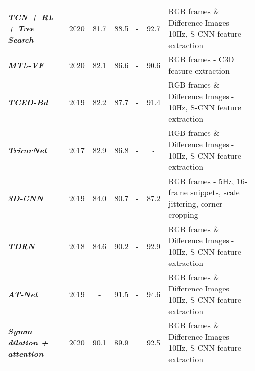 \documentclass[journal]{IEEEtran}
\begin{document}
\begin{table*}[t!]
\begin{threeparttable}
\begin{tabular}{m{2.3cm}|P{0.6cm}|c|c|c|c|m{9.0cm}}
    		 \textbf{\textit{TCN + RL +}} 
    		\newline
    		\textbf{\textit{Tree Search}} \scriptsize \cite{Gao2020} &2020 &81.7 &88.5 &- &92.7 & RGB frames \& Difference Images - 10Hz, S-CNN  \cite{Lea2016} feature extraction\\
    		 \textbf{\textit{MTL-VF}} \scriptsize \cite{Wang2020} &2020 &82.1 &86.6 &- &90.6  &RGB frames - C3D \cite{Tran2015} feature extraction \\
    		 \textbf{\textit{TCED-Bd}} \scriptsize \cite{Zhang2019} &2019  &82.2 &87.7 &- &91.4  &RGB frames \& Difference Images - 10Hz, S-CNN  \cite{Lea2016} feature extraction\\
    		 \textbf{\textit{TricorNet}} \scriptsize \cite{Ding2017} &2017  &82.9 &86.8  &- &-  &RGB frames \& Difference Images - 10Hz, S-CNN  \cite{Lea2016} feature extraction\\
    		 \textbf{\textit{3D-CNN}} \scriptsize \cite{Funke2019} &2019  &84.0  &80.7 &- &87.2  &RGB frames - 5Hz, 16-frame snippets, scale jittering, corner cropping \\
    		 \textbf{\textit{TDRN}} \scriptsize \cite{Lei2018} &2018  &84.6 &90.2 &- &92.9  &RGB frames \& Difference Images - 10Hz, S-CNN  \cite{Lea2016} feature extraction\\
    		 \textbf{\textit{AT-Net}} \scriptsize \cite{Wang2019} &2019  &- &91.5 &- &94.6 & RGB frames \& Difference Images - 10Hz, S-CNN  \cite{Lea2016} feature extraction\\
    		 \textbf{\textit{Symm dilation +}} 
    		\newline
    		\textbf{\textit{attention}} \scriptsize \cite{Zhang2020}  &2020	&90.1 &89.9 &- &92.5 &RGB frames \& Difference Images - 10Hz, S-CNN  \cite{Lea2016} feature extraction\\

\end{tabular}
\end{threeparttable}
\end{table*}
\end{document}
